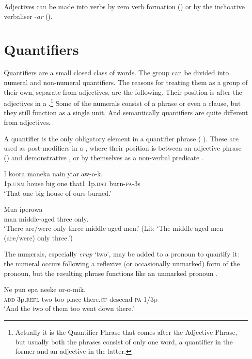 Adjectives can be made into verbs by zero verb formation () or by the inchoative verbaliser \nobreakdash-\textit{ar} ().

\section{Quantifiers}\label{sec:3.4}
{}
Quantifiers are a small closed class of words. The group can be divided into numeral and non-numeral quantifiers. The reasons for treating them as a group of their own, separate from adjectives, are the following. Their position is after the adjectives in a .\footnote{Actually it is the Quantifier Phrase that comes after the Adjective Phrase, but usually both the phrases consist of only one word, a quantifier in the former and an adjective in the latter.} Some of the numerals consist of a phrase or even a clause, but they still function as a single unit. And semantically quantifiers are quite different from adjectives.

A quantifier is the only obligatory element in a quantifier phrase ( ). These are used as post-modifiers in a , where their position is between an adjective phrase () and demonstrative , or by themselves as a non-verbal predicate . 

\ea%
\label{ex:3:x87}
\gll I koora maneka  nain yiar aw-o-k. \\
1p.\textsc{unm} house big one that1 1p.\textsc{dat} burn-\textsc{pa}-3s\\
\glt`That one big house of ours burned.'
\z

\ea%
\label{ex:3:x442}
\gll Mua iperowa   \\
man middle-aged three only.\\
\glt`There are/were only three middle-aged men.' (Lit: `The middle-aged men (are/were) only three.') 
\z

The numerals, especially \textit{erup} `two', may be added to a pronoun to quantify it: the numeral occurs following a reflexive (or occasionally unmarked) form of the pronoun, but the resulting phrase functions like an unmarked pronoun .

\ea%
\label{ex:3:x89}
\gll Ne   pun epa neeke or-o-mik. \\
\textsc{add} 3p.\textsc{refl} two too place there.\textsc{cf} descend-\textsc{pa}-1/3p\\
\glt`And the two of them too went down there.'
\z

